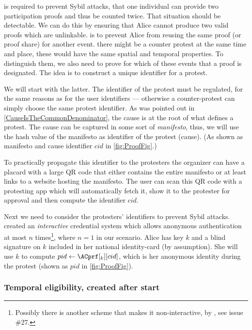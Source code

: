  is required to prevent Sybil attacks, \ie that one individual 
can provide two participation proofs and thus be counted twice.
That situation should be detectable.
We can do this by ensuring that Alice cannot produce two valid proofs which
are unlinkable.
 is to prevent Alice from reusing the same proof (or proof 
share) for another event.
\Eg there might be a counter protest at the same time and place, these would 
have the same spatial and temporal properties.
To distinguish them, we also need to prove for which of these events that a 
proof is designated.
The idea is to construct a unique identifier for a protest.

We will start with the latter.
The identifier of the protest must be regulated, for the same reasons as for the 
user identifiers --- otherwise a counter-protest can simply choose the same 
protest identifier.
As was pointed out in \cref{CauseIsTheCommonDenominator}, the cause is at the 
root of what defines a protest.
The cause can be captured in some sort of \emph{manifesto}, thus, we will use 
the hash value of the manifesto as identifier of the protest (cause).
(As shown as manifesto and cause identifier \(cid\) in \cref{fig:ProofFig}.)

To practically propagate this identifier to the protesters the organizer can 
have a placard with a large QR code that either contains the entire manifesto or 
at least links to a website hosting the manifesto.
The user can scan this QR code with a protesting app which will automatically 
fetch it, show it to the protester for approval and then compute the identifier 
\(cid\).

Next we need to consider the protesters' identifiers to prevent Sybil attacks.
 created an \emph{interactive} credential system 
which allows anonymous authentication at most \(n\) times\footnote{%
  Possibly there is another scheme that makes it non-interactive, \eg by 
  \citet{Psignatures}, see issue \#27.
}, where \(n = 1\) in our scenario.
Alice has  key \(k\) and a blind signature on \(k\) included in her 
national identity-card (by assumption).
She will use \(k\) to compute \(pid\gets \ACprf[_k][cid]\), which is her 
anonymous identity during the protest (shown as \(pid\) in \cref{fig:ProofFig}).

\subsubsection{Temporal eligibility, created after start}

